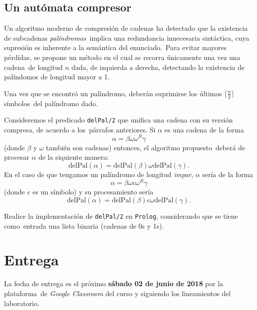 \documentclass[paper=letter, fontsize=12pt]{scrartcl}
\begin{document}
\subsection{Un autómata compresor}

\noindent
Un algoritmo moderno de compresión de cadenas ha detectado que la existencia de subcadenas \emph{palíndromas}\
implica una redundancia innecesaria sintáctica, cuya supresión es inherente a la semántica del enunciado.\
Para evitar mayores pérdidas, se propone un método en el cual se recorra únicamente una vez una cadena\
de longitud $n$ dada, de izquierda a derecha, detectando la existencia de palíndomos de longitud mayor a 1.\par
Una vez que se encontró un palíndromo, deberán suprimirse los últimos $\lceil\frac{n}{2}\rceil$ símbolos\
del palíndromo dado.\par
Consideremos el predicado \verb+delPal/2+ que unifica una cadena con su versión compresa, de acuerdo a los\
párrafos anteriores. Si $\alpha$ es una cadena de la forma
\[\alpha = \beta\omega\omega^R\gamma\]
(donde $\beta$ y $\omega$ también son cadenas) entonces, el algoritmo propuesto\
deberá de procesar $\alpha$ de la siquiente manera:
\[\text{delPal}(\alpha) = \text{delPal}(\beta)\omega\text{delPal}(\gamma).\]
En el caso de que tengamos un palíndromo de longitud \emph{impar}, $\alpha$ sería de la forma
\[\alpha = \beta\omega c \omega^R\gamma\]
(donde $c$ es un símbolo) y su procesamiento sería
\[\text{delPal}(\alpha) = \text{delPal}(\beta)c\omega\text{delPal}(\gamma).\]

Realice la implementación de \verb+delPal/2+ en \verb+Prolog+, considerando que se tiene como\
entrada una lista binaria (cadenas de 0s y 1s).

\section{Entrega}

\noindent
La fecha de entrega es el próximo \textbf{sábado 02 de junio de 2018} por la plataforma\
de \emph{Google Classroom} del curso y siguiendo los lineamientos del laboratorio.
\end{document}
